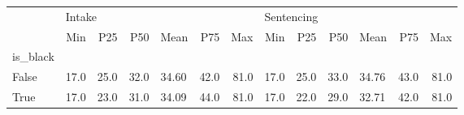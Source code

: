 \begin{tabular}{lrrrlrrrrrlrr}
\toprule
{} & \multicolumn{6}{l}{Intake} & \multicolumn{6}{l}{Sentencing} \\
{} &    Min &   P25 &   P50 &   Mean &   P75 &   Max &        Min &   P25 &   P50 &   Mean &   P75 &   Max \\
is\_black &        &       &       &        &       &       &            &       &       &        &       &       \\
\midrule
False    &   17.0 &  25.0 &  32.0 &  34.60 &  42.0 &  81.0 &       17.0 &  25.0 &  33.0 &  34.76 &  43.0 &  81.0 \\
True     &   17.0 &  23.0 &  31.0 &  34.09 &  44.0 &  81.0 &       17.0 &  22.0 &  29.0 &  32.71 &  42.0 &  81.0 \\
\bottomrule
\end{tabular}
